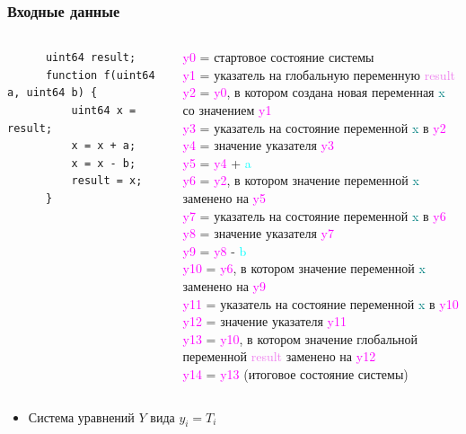 \documentclass{beamer}
\begin{document}
\begin{frame}[containsverbatim]\frametitle{Входные данные}
  {\fontsize{4}{2}\selectfont \begin{columns}
    \begin{verbatim}
      uint64 result;
      function f(uint64 a, uint64 b) {
          uint64 x = result;
          x = x + a;
          x = x - b;
          result = x;
      }
      \end{verbatim}
    \newenvironment{allintypewriter}{\ttfamily}{}\begin{allintypewriter}\textcolor{magenta}{y0} = стартовое состояние системы\\
    \textcolor{magenta}{y1} = указатель на глобальную переменную \textcolor{violet}{result}\\
    \textcolor{magenta}{y2} = \textcolor{magenta}{y0}, в котором создана новая переменная \textcolor{teal}{x} со значением \textcolor{magenta}{y1}\\
    \textcolor{magenta}{y3} = указатель на состояние переменной \textcolor{teal}{x} в \textcolor{magenta}{y2}\\
    \textcolor{magenta}{y4} = значение указателя \textcolor{magenta}{y3}\\
    \textcolor{magenta}{y5} = \textcolor{magenta}{y4} + \textcolor{cyan}{a}\\
    \textcolor{magenta}{y6} = \textcolor{magenta}{y2}, в котором значение переменной \textcolor{teal}{x} заменено на \textcolor{magenta}{y5}\\
    \textcolor{magenta}{y7} = указатель на состояние переменной \textcolor{teal}{x} в \textcolor{magenta}{y6}\\
    \textcolor{magenta}{y8} = значение указателя \textcolor{magenta}{y7}\\
    \textcolor{magenta}{y9} = \textcolor{magenta}{y8} - \textcolor{cyan}{b}\\
    \textcolor{magenta}{y10} = \textcolor{magenta}{y6}, в котором значение переменной \textcolor{teal}{x} заменено на \textcolor{magenta}{y9}\\
    \textcolor{magenta}{y11} = указатель на состояние переменной \textcolor{teal}{x} в \textcolor{magenta}{y10}\\
    \textcolor{magenta}{y12} = значение указателя \textcolor{magenta}{y11}\\
    \textcolor{magenta}{y13} = \textcolor{magenta}{y10}, в котором значение глобальной переменной \textcolor{violet}{result} заменено на \textcolor{magenta}{y12}\\
    \textcolor{magenta}{y14} = \textcolor{magenta}{y13} (итоговое состояние системы)
    \end{allintypewriter}
    \end{columns}
  }
  \bigskip
  \begin{itemize}
    \item Система уравнений $Y$ вида $y_i = T_i$
    

\end{itemize}
\end{frame}
\end{document}
